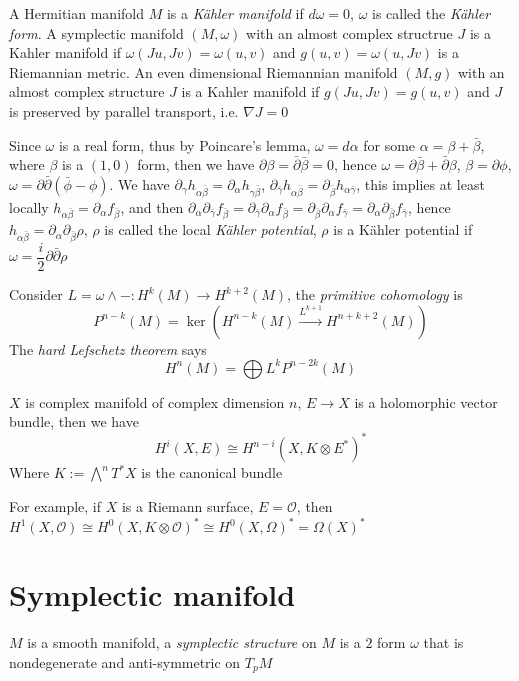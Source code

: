 \documentclass[main]{subfiles}
\begin{document}
\begin{definition}
A Hermitian manifold $M$ is a \textit{K\"ahler manifold} if $d\omega=0$, $\omega$ is called the \textit{K\"ahler form}. A symplectic manifold $(M,\omega)$ with an almost complex structrue $J$ is a Kahler manifold if $\omega(Ju,Jv)=\omega(u,v)$ and $g(u,v)=\omega(u,Jv)$ is a Riemannian metric. An even dimensional Riemannian manifold $(M,g)$ with an almost complex structure $J$ is a Kahler manifold if $g(Ju,Jv)=g(u,v)$ and $J$ is preserved by parallel transport, i.e. $\nabla J=0$

Since $\omega$ is a real form, thus by Poincare's lemma, $\omega=d\alpha$ for some $\alpha=\beta+\bar\beta$, where $\beta$ is a $(1,0)$ form, then we have $\partial\beta=\bar\partial\bar\beta=0$, hence $\omega=\partial\bar\beta+\bar\partial\beta$, $\beta=\partial\phi$, $\omega=\partial\bar\partial(\bar\phi-\phi)$. We have $\partial_{\gamma}h_{\alpha\bar\beta}=\partial_{\alpha}h_{\gamma\bar\beta}$, $\partial_{\bar\gamma}h_{\alpha\bar\beta}=\partial_{\bar\beta}h_{\alpha\bar\gamma}$, this implies at least locally $h_{\alpha\bar\beta}=\partial_\alpha f_{\bar\beta}$, and then $\partial_\alpha\partial_{\bar\gamma}f_{\bar\beta}=\partial_{\bar\gamma}\partial_\alpha f_{\bar\beta}=\partial_{\bar\beta}\partial_\alpha f_{\bar\gamma}=\partial_\alpha\partial_{\bar\beta}f_{\bar\gamma}$, hence $h_{\alpha\bar\beta}=\partial_\alpha\partial_{\bar\beta}\rho$, $\rho$ is called the local \textit{K\"ahler potential}, $\rho$ is a K\"ahler potential if $\omega=\dfrac{i}{2}\partial\bar\partial\rho$
\end{definition}

\begin{definition}
Consider $L=\omega\wedge-:H^k(M)\to H^{k+2}(M)$, the \textit{primitive cohomology} is
\[P^{n-k}(M)=\ker\left(H^{n-k}(M)\xrightarrow{L^{k+1}}H^{n+k+2}(M)\right)\]
The \textit{hard Lefschetz theorem} says
\[H^n(M)=\bigoplus L^kP^{n-2k}(M)\]
\end{definition}

\begin{theorem}\label{Serre duality}
$X$ is complex manifold of complex dimension $n$, $E\to X$ is a holomorphic vector bundle, then we have
\[H^i(X,E)\cong H^{n-i}(X,K\otimes E^*)^*\]
Where $K:=\bigwedge^n T^*X$ is the canonical bundle \par
For example, if $X$ is a Riemann surface, $E=\mathcal{O}$, then $H^1(X,\mathcal{O})\cong H^0(X,K\otimes\mathcal{O})^*\cong H^0(X,\Omega)^*=\Omega(X)^*$
\end{theorem}



\section{Symplectic manifold}

\begin{definition}
$M$ is a smooth manifold, a \textit{symplectic structure} on $M$ is a $2$ form $\omega$ that is nondegenerate and anti-symmetric on $T_pM$
\end{definition}
\end{document}
